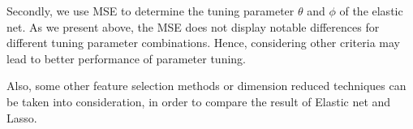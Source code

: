 Secondly, we use MSE to determine the tuning parameter $\theta$ and $\phi$ of the elastic net. 
As we present above, the MSE  does not display notable differences for different tuning parameter combinations.
Hence, considering other criteria may lead to better performance of parameter tuning.

Also, some other feature selection methods or dimension reduced techniques can be taken into consideration, in order to compare the result of Elastic net and Lasso.


